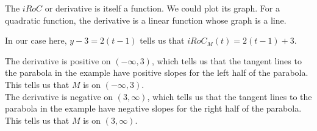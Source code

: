 \documentclass{ximera}
\begin{document}
\begin{explanation}
The $iRoC$ or derivative is itself a function.  We could plot its graph. For a quadratic function, the derivative is a linear function whose graph is a line.

In our case here, $y - 3 = 2(t-1)$ tells us that $iRoC_M(t) = 2(t-1)+3$.










\begin{image}
\end{image}


The derivative is positive on $(-\infty, 3)$, which tells us that the tangent lines to the parabola in the example have positive slopes for the left half of the parabola. This tells us that $M$ is   on $(-\infty, 3)$. \\

The derivative is negative on $(3, \infty)$, which tells us that the tangent lines to the parabola in the example have negative slopes for the right half of the parabola. This tells us that $M$ is   on $(3, \infty)$. \\




\end{explanation}
\end{document}
